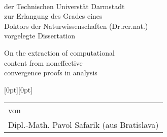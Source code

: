\begin{titlepage}


\vspace*{.5cm}

\\
{\hspace*{0pt}\color{titlegray}\normalsize der Technischen Universt\"at Darmstadt}\\
{\hspace*{0pt}\color{titlegray}\normalsize zur Erlangung des Grades eines}\\
{\hspace*{0pt}\color{titlegray}\normalsize Doktors der Naturwissenschaften (Dr.rer.nat.)}\\
{\hspace*{0pt}\normalsize vorgelegte} {\color{titlegray}\normalsize Dissertation}

\vspace*{14mm}

{\Huge
 \filinner
 \sffamily{}\selectfont
 {On the extraction of computational\\}
 \filinner
 \sffamily{}\selectfont
 {content from noneffective \\}
 \filinner
 \sffamily{}\selectfont
 {convergence proofs in analysis\\}}

\vspace{11cm}

\vspace{2cm}
\raisebox{0.7cm}[0pt][0pt]
{%
  \normalsize
  \vspace{-1cm}
  \hfill
  \begin{tabular}{@{}l}
    {\color{titlegray} von} \\
    {\LARGE Dipl.-Math. Pavol Safarik} {\color{titlegray} {(aus Bratislava)}}
  \end{tabular}
}


\end{titlepage}

\newpage
\thispagestyle{empty}

